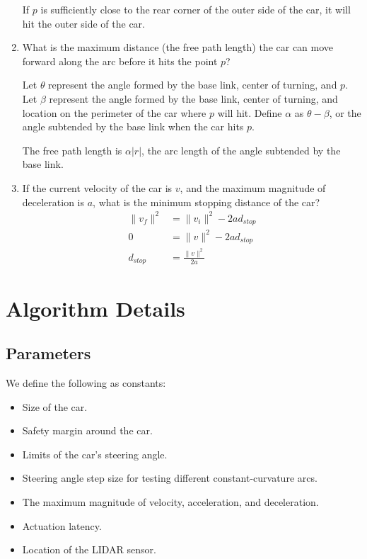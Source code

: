 \documentclass[11pt]{article}
\begin{document}
\begin{enumerate}[leftmargin=*]
    If $p$ is sufficiently close to the rear corner of the outer side of the
    car, it will hit the outer side of the car.


    \item
    What is the maximum distance (the free path length) the car can move forward
    along the arc before it hits the point $p$?

    Let $\theta$ represent the angle formed by the base link, center of turning,
    and $p$.
    Let $\beta$ represent the angle formed by the base link, center of turning,
    and location on the perimeter of the car where $p$ will hit.  Define
    $\alpha$ as $\theta - \beta$, or the angle subtended by the base link when
    the car hits $p$.

    The free path length is $\alpha \lvert r \rvert$, the arc length of the
    angle subtended by the base link.

    \item
    If the current velocity of the car is $v$, and the maximum magnitude of
    deceleration is $a$, what is the minimum stopping distance of the car?
    \begin{align*}
        \lVert v_f \rVert^2 &= \lVert v_i \rVert^2 - 2ad_{stop} \\
        0 &= \lVert v \rVert^2 - 2 a d_{stop} \\
        d_{stop} &= \frac{\lVert v \rVert^2}{2a}
    \end{align*}
\end{enumerate}

\section{Algorithm Details}

\subsection{Parameters}

We define the following as constants:
\begin{itemize}
    \item Size of the car.
    \item Safety margin around the car.
    \item Limits of the car's steering angle.
    \item Steering angle step size for testing different constant-curvature arcs.
    \item The maximum magnitude of velocity, acceleration, and deceleration.
    \item Actuation latency.
    \item Location of the LIDAR sensor.
\end{itemize}
\end{document}
